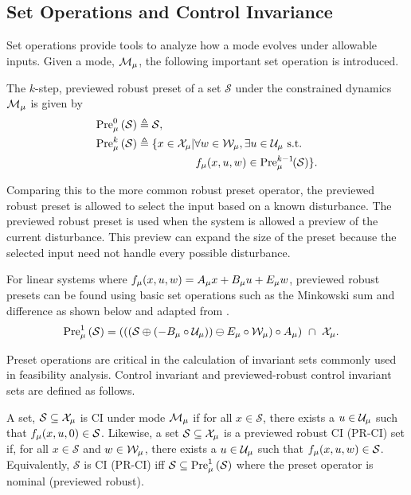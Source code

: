 \subsection{Set Operations and Control Invariance}
Set operations provide tools to analyze how a mode evolves under allowable inputs. Given a mode, $\mode{\modeidx}$, the following important set operation is introduced. 
\begin{definition}\label{def:prev_robust_preset}
The $k$-step, previewed robust preset of a set $\mathcal{S}$ under the constrained dynamics $\mode{\modeidx}$ is given by
\begin{align}
\PreviewedPre[\modeidx][0]{\mathcal{S}}&\triangleq\mathcal{S},\\
\PreviewedPre[\modeidx][k]{\mathcal{S}}&\triangleq\{x\in\xcon[\modeidx]|\forall w\in\wcon[\modeidx],\exists u\in\ucon[\modeidx]\text{ s.t. }\nonumber\\
&\hspace{1.85cm} f_\modeidx(x,u,w)\in\PreviewedPre[\modeidx][k-1]{\mathcal{S}}\}.
\end{align}
\end{definition}
Comparing this to the more common robust preset operator, the previewed robust preset is allowed to select the input based on a known disturbance. The previewed robust preset is used when the system is allowed a preview of the current disturbance. This preview can expand the size of the preset because the selected input need not handle every possible disturbance. 

For linear systems where $f_{\mu}(x,u,w) = A_{\mu} x + B_{\mu} u + E_{\mu} w$, previewed robust presets can be found using basic set operations such as the Minkowski sum and difference as shown below and adapted from \cite{Borrelli2017}.
\begin{align*}
\PreviewedPre[\modeidx][1]{\mathcal{S}} &= \left(\left(\left(\mathcal{S}\oplus\left(-B_\modeidx\circ\ucon[\modeidx]\right)\right)\ominus E_\modeidx\circ\wcon[\modeidx]\right)\circ A_\modeidx\right)\ \cap\ \xcon[\modeidx].
\end{align*}

Preset operations are critical in the calculation of invariant sets commonly used in feasibility analysis. Control invariant and previewed-robust control invariant sets are defined as follows.
\begin{definition}\label{def:ci_set}
A set, $\mathcal{S}\subseteq\xcon[\modeidx]$ is CI under mode $\mode{\modeidx}$ if for all $x\in\mathcal{S}$, there exists a $u\in\ucon[\modeidx]$ such that $f_{\mu}(x,u,0)\in\mathcal{S}$. Likewise, a set $\mathcal{S}\subseteq\xcon[\modeidx]$ is a previewed robust CI (PR-CI) set if, for all $x\in\mathcal{S}$ and $w\in\mathcal{W}_{\mu}$, there exists a $u\in\ucon[\modeidx]$ such that $f_{\mu}(x,u,w)\in\mathcal{S}$. Equivalently, $\mathcal{S}$ is CI (PR-CI) iff $\mathcal{S}\subseteq\Pre[\modeidx][1]{\mathcal{S}}$ where the preset operator is nominal (previewed robust).
\end{definition}


